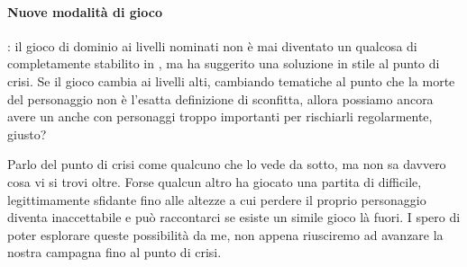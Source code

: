 \paragraph{Nuove modalità di gioco}: il gioco di dominio ai livelli nominati non è mai diventato un qualcosa di completamente stabilito in \dnd{}, ma ha suggerito una soluzione in stile  al punto di crisi. Se il gioco cambia ai livelli alti, cambiando tematiche al punto che la morte del personaggio non è l'esatta definizione di sconfitta, allora possiamo ancora avere un  anche con personaggi troppo importanti per rischiarli regolarmente, giusto?

Parlo del punto di crisi come qualcuno che lo vede da sotto, ma non sa davvero cosa vi si trovi oltre. Forse qualcun altro ha giocato una partita di \dnd{} difficile, legittimamente sfidante fino alle altezze a cui perdere il proprio personaggio diventa inaccettabile e può raccontarci se esiste un simile gioco là fuori. I spero di poter esplorare queste possibilità da me, non appena riusciremo ad avanzare la nostra campagna fino al punto di crisi.
